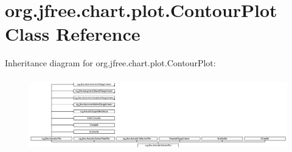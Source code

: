 \hypertarget{classorg_1_1jfree_1_1chart_1_1plot_1_1_contour_plot}{}\section{org.\+jfree.\+chart.\+plot.\+Contour\+Plot Class Reference}
\label{classorg_1_1jfree_1_1chart_1_1plot_1_1_contour_plot}
Inheritance diagram for org.\+jfree.\+chart.\+plot.\+Contour\+Plot\+:\begin{figure}[H]
\begin{center}
\leavevmode
\includegraphics[height=3.218391cm]{classorg_1_1jfree_1_1chart_1_1plot_1_1_contour_plot}
\end{center}
\end{figure}
